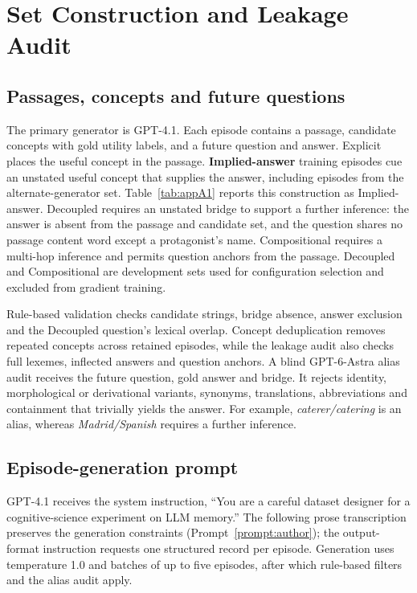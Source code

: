 \section{Set Construction and Leakage Audit}
\label{app:benchmarks}

\subsection{Passages, concepts and future questions}

The primary generator is GPT-4.1. Each episode contains a passage,
candidate concepts with gold utility labels, and a future question and
answer. Explicit places the useful concept in the passage.
\textbf{Implied-answer} training episodes cue an unstated useful concept
that supplies the answer, including episodes from the
alternate-generator set. Table~\ref{tab:appA1} reports this construction
as Implied-answer. Decoupled requires an unstated bridge to support a
further inference: the answer is absent from the passage and candidate
set, and the question shares no passage content word except a
protagonist's name. Compositional requires a multi-hop inference and
permits question anchors from the passage. Decoupled and Compositional
are development sets used for configuration selection and excluded from
gradient training.

Rule-based validation checks candidate strings, bridge absence, answer
exclusion and the Decoupled question's lexical overlap. Concept
deduplication removes repeated concepts across retained episodes, while
the leakage audit also checks full lexemes, inflected answers and
question anchors. A blind GPT-6-Astra alias audit receives the future
question, gold answer and bridge. It rejects identity, morphological or
derivational variants, synonyms, translations, abbreviations and
containment that trivially yields the answer. For example,
\emph{caterer/catering} is an alias, whereas \emph{Madrid/Spanish}
requires a further inference.

\subsection{Episode-generation prompt}
\label{app:authorprompt}
GPT-4.1 receives the system instruction, ``You are a careful dataset
designer for a cognitive-science experiment on LLM memory.'' The
following prose transcription preserves the generation constraints
(Prompt~\ref{prompt:author}); the output-format instruction requests one
structured record per episode. Generation uses temperature 1.0 and
batches of up to five episodes, after which rule-based filters and the
alias audit apply.

